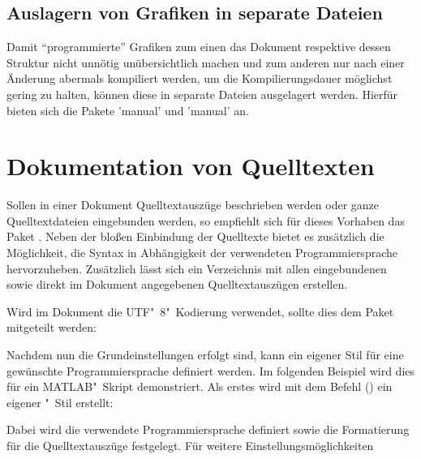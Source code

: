 \documentclass[%
  english,ngerman,%
  cdgeometry=no,DIV=12,%
  automark,%
  listof=toc,%
]{tudscrartcl}
\begin{document}
\subsection{Auslagern von Grafiken in separate Dateien}
Damit \enquote{programmierte} Grafiken zum einen das Dokument respektive dessen 
Struktur nicht unnötig unübersichtlich machen und zum anderen nur nach einer 
Änderung abermals kompiliert werden, um die Kompilierungsdauer möglichst gering 
zu halten, können diese in separate Dateien ausgelagert werden. Hierfür bieten 
sich die Pakete 'manual' und 'manual' an.



\section{Dokumentation von Quelltexten}
Sollen in einer Dokument Quelltextauszüge beschrieben werden oder ganze 
Quelltextdateien eingebunden werden, so empfiehlt sich für dieses Vorhaben das 
Paket . Neben der bloßen Einbindung der Quelltexte bietet es 
zusätzlich die Möglichkeit, die Syntax in Abhängigkeit der verwendeten 
Programmiersprache hervorzuheben. Zusätzlich lässt sich ein Verzeichnis mit 
allen eingebundenen sowie direkt im Dokument angegebenen Quelltextauszügen 
erstellen.
%
\begin{Hint}
\usepackage{listings}
\end{Hint}
%
Wird im Dokument die UTF"~8"~Kodierung verwendet, sollte dies dem Paket 
mitgeteilt werden:
%
\begin{Hint}
\end{Hint}
%
Nachdem nun die Grundeinstellungen erfolgt sind, kann ein eigener Stil für eine 
gewünschte Programmiersprache definiert werden. Im folgenden Beispiel wird dies 
für ein MATLAB"~Skript demonstriert. Als erstes wird mit dem Befehl 
() ein eigener "~Stil 
erstellt:
%
\begin{Hint*}
\end{Hint*}
%
Dabei wird die verwendete Programmiersprache definiert sowie die Formatierung 
für die Quelltextauszüge festgelegt. Für weitere Einstellungsmöglichkeiten 
\end{document}
